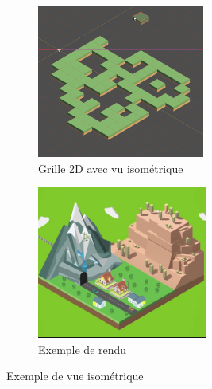 \begin{figure}[h]
 
\begin{subfigure}{0.5\textwidth}
\includegraphics[width=0.9\linewidth, height=5cm]{images/2diso.png} 
\caption{Grille 2D avec vu isométrique}
\label{fig:subim1}
\end{subfigure}
\begin{subfigure}{0.5\textwidth}
\includegraphics[width=0.9\linewidth, height=5cm]{images/2diso2.png}
\caption{Exemple de rendu}
\label{fig:subim2}
\end{subfigure}
 
    \caption{Exemple de vue isométrique}
\label{fig:image2}
\end{figure}